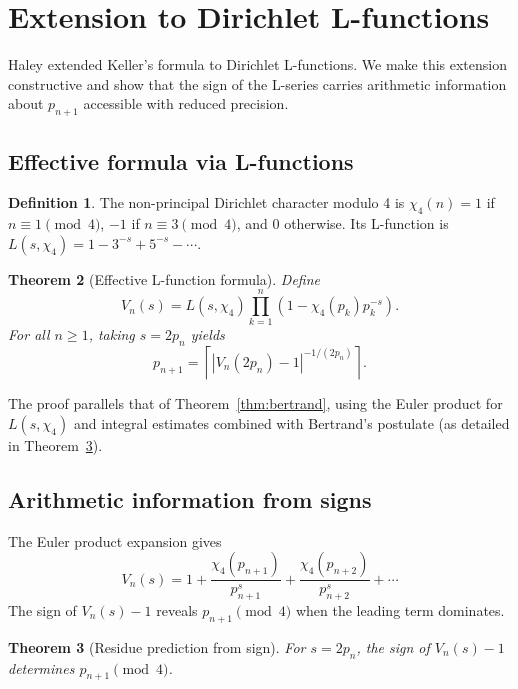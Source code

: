 \documentclass[12pt]{article}
\theoremstyle{plain}
\newtheorem{theorem}{Theorem}
\theoremstyle{definition}
\newtheorem{definition}[theorem]{Definition}
\theoremstyle{remark}
\begin{document}
\section{Extension to Dirichlet L-functions}

Haley \cite{Haley2013} extended Keller's formula to Dirichlet L-functions. We make this extension constructive and show that the sign of the L-series carries arithmetic information about $p_{n+1}$ accessible with reduced precision.

\subsection{Effective formula via L-functions}

\begin{definition}
The non-principal Dirichlet character modulo 4 is $\chi_4(n) = 1$ if $n \equiv 1 \pmod 4$, $-1$ if $n \equiv 3 \pmod 4$, and $0$ otherwise. Its L-function is $L(s, \chi_4) = 1 - 3^{-s} + 5^{-s} - \cdots$.
\end{definition}

\begin{theorem}[Effective L-function formula]
\label{thm:dirichlet_main}
Define
\[
V_n(s) = L(s, \chi_4) \prod_{k=1}^{n} (1 - \chi_4(p_k)p_k^{-s}).
\]
For all $n \geq 1$, taking $s = 2p_n$ yields
\[
p_{n+1} = \left\lceil \left|V_n(2p_n) - 1\right|^{-1/(2p_n)} \right\rceil.
\]
\end{theorem}

The proof parallels that of Theorem~\ref{thm:bertrand}, using the Euler product for $L(s,\chi_4)$ and integral estimates combined with Bertrand's postulate (as detailed in Theorem~\ref{thm:dirichlet_sign}).

\subsection{Arithmetic information from signs}

The Euler product expansion gives
\[
V_n(s) = 1 + \frac{\chi_4(p_{n+1})}{p_{n+1}^s} + \frac{\chi_4(p_{n+2})}{p_{n+2}^s} + \cdots
\]
The sign of $V_n(s) - 1$ reveals $p_{n+1} \pmod 4$ when the leading term dominates.

\begin{theorem}[Residue prediction from sign]
\label{thm:dirichlet_sign}
For $s = 2p_n$, the sign of $V_n(s) - 1$ determines $p_{n+1} \pmod 4$.
\end{theorem}
\end{document}
